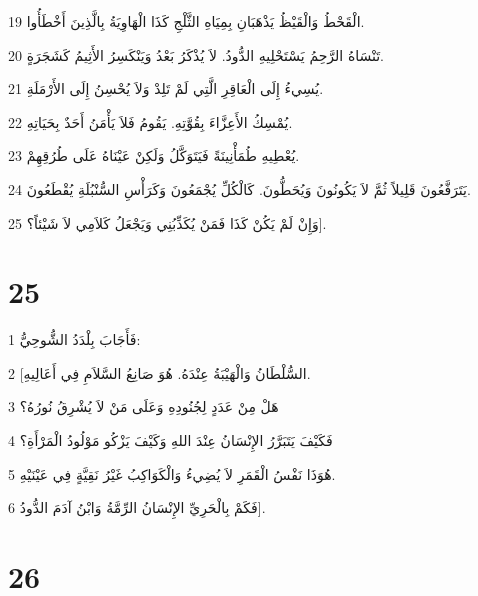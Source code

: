 \par 19 الْقَحْطُ وَالْقَيْظُ يَذْهَبَانِ بِمِيَاهِ الثَّلْجِ كَذَا الْهَاوِيَةُ بِالَّذِينَ أَخْطَأُوا.
\par 20 تَنْسَاهُ الرَّحِمُ يَسْتَحْلِيهِ الدُّودُ. لاَ يُذْكَرُ بَعْدُ وَيَنْكَسِرُ الأَثِيمُ كَشَجَرَةٍ.
\par 21 يُسِيءُ إِلَى الْعَاقِرِ الَّتِي لَمْ تَلِدْ وَلاَ يُحْسِنُ إِلَى الأَرْمَلَةِ.
\par 22 يُمْسِكُ الأَعِزَّاءَ بِقُوَّتِهِ. يَقُومُ فَلاَ يَأْمَنُ أَحَدٌ بِحَيَاتِهِ.
\par 23 يُعْطِيهِ طُمَأْنِينَةً فَيَتَوَكَّلُ وَلَكِنْ عَيْنَاهُ عَلَى طُرُقِهِمْ.
\par 24 يَتَرَفَّعُونَ قَلِيلاً ثُمَّ لاَ يَكُونُونَ وَيُحَطُّونَ. كَالْكُلِّ يُجْمَعُونَ وَكَرَأْسِ السُّنْبُلَةِ يُقْطَعُونَ.
\par 25 وَإِنْ لَمْ يَكُنْ كَذَا فَمَنْ يُكَذِّبُنِي وَيَجْعَلُ كَلاَمِي لاَ شَيْئاً؟].

\chapter{25}

\par 1 فَأَجَابَ بِلْدَدُ الشُّوحِيُّ:
\par 2 [السُّلْطَانُ وَالْهَيْبَةُ عِنْدَهُ. هُوَ صَانِعُ السَّلاَمِ فِي أَعَالِيهِ.
\par 3 هَلْ مِنْ عَدَدٍ لِجُنُودِهِ وَعَلَى مَنْ لاَ يُشْرِقُ نُورُهُ؟
\par 4 فَكَيْفَ يَتَبَرَّرُ الإِنْسَانُ عِنْدَ اللهِ وَكَيْفَ يَزْكُو مَوْلُودُ الْمَرْأَةِ؟
\par 5 هُوَذَا نَفْسُ الْقَمَرِ لاَ يُضِيءُ وَالْكَوَاكِبُ غَيْرُ نَقِيَّةٍ فِي عَيْنَيْهِ.
\par 6 فَكَمْ بِالْحَرِيِّ الإِنْسَانُ الرِّمَّةُ وَابْنُ آدَمَ الدُّودُ].

\chapter{26}

